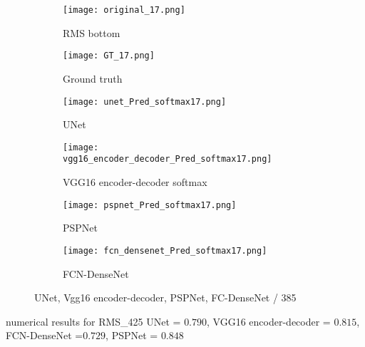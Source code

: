 	\begin{figure}[!h]
		\centering
		\begin{subfigure}[b]{0.47\textwidth}
			\centering
			\texttt{[image: original\_17.png]}
			\caption{RMS bottom}
			\label{fig:RMS_flat_shell_Vz_385}
		\end{subfigure}
		\hfill
		\begin{subfigure}[b]{0.47\textwidth}
			\centering
			\texttt{[image: GT\_17.png]}
			\caption{Ground truth}
			\label{fig:m1_rand_single_delam_385}
		\end{subfigure}
		\begin{subfigure}[b]{0.47\textwidth}
			\centering
			\texttt{[image: unet\_Pred\_softmax17.png]}
			\caption{UNet}
			\label{fig:Unet_Pred__softmax_385}
		\end{subfigure}
		\hfill
		\begin{subfigure}[b]{0.47\textwidth}
			\centering
			\texttt{[image: vgg16\_encoder\_decoder\_Pred\_softmax17.png]}
			\caption{VGG16 encoder-decoder softmax}			\label{fig:vgg16_pred__softmax_385}			
		\end{subfigure}
		\hfill
		\begin{subfigure}[b]{0.47\textwidth}
			\centering
			\texttt{[image: pspnet\_Pred\_softmax17.png]}
			\caption{PSPNet}
			\label{fig:pspnet_pred__softmax_385}
		\end{subfigure}	
		\hfill
		\begin{subfigure}[b]{0.47\textwidth}
			\centering
			\texttt{[image: fcn\_densenet\_Pred\_softmax17.png]}
			\caption{FCN-DenseNet}
			\label{fig:fcn_densenet_pred__softmax_385}
		\end{subfigure}	
		\caption{UNet, Vgg16 encoder-decoder, PSPNet, FC-DenseNet / 385}
		\label{fig:391_softmax}
	\end{figure}

numerical results for RMS\_425
UNet = \(0.790\), VGG16 encoder-decoder = \(0.815\), FCN-DenseNet =\(0.729\), PSPNet = \(0.848\)
	

